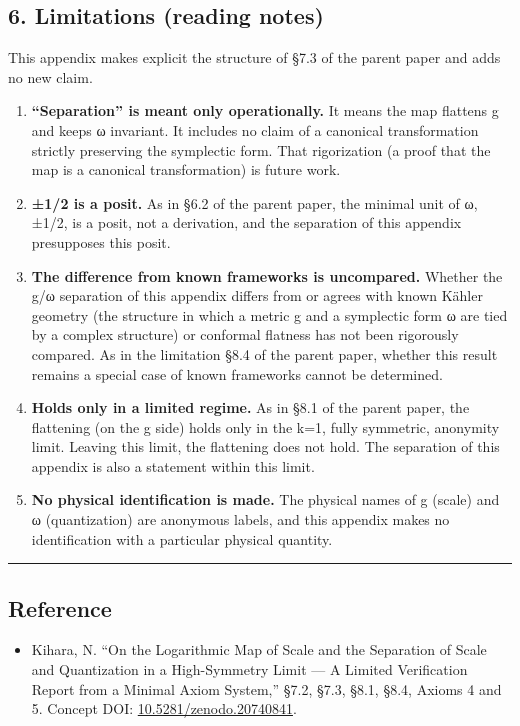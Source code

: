 \documentclass[11pt]{ltjsarticle}
\providecommand{\tightlist}{\setlength{\itemsep}{0pt}\setlength{\parskip}{0pt}}
\begin{document}
\subsection{6. Limitations (reading
notes)}\label{limitations-reading-notes}

This appendix makes explicit the structure of §7.3 of the parent paper
and adds no new claim.

\begin{enumerate}
\def\labelenumi{\arabic{enumi}.}
\item
  \textbf{``Separation'' is meant only operationally.} It means the map
  flattens g and keeps ω invariant. It includes no claim of a canonical
  transformation strictly preserving the symplectic form. That
  rigorization (a proof that the map is a canonical transformation) is
  future work.
\item
  \textbf{±1/2 is a posit.} As in §6.2 of the parent paper, the minimal
  unit of ω, ±1/2, is a posit, not a derivation, and the separation of
  this appendix presupposes this posit.
\item
  \textbf{The difference from known frameworks is uncompared.} Whether
  the g/ω separation of this appendix differs from or agrees with known
  Kähler geometry (the structure in which a metric g and a symplectic
  form ω are tied by a complex structure) or conformal flatness has not
  been rigorously compared. As in the limitation §8.4 of the parent
  paper, whether this result remains a special case of known frameworks
  cannot be determined.
\item
  \textbf{Holds only in a limited regime.} As in §8.1 of the parent
  paper, the flattening (on the g side) holds only in the k=1, fully
  symmetric, anonymity limit. Leaving this limit, the flattening does
  not hold. The separation of this appendix is also a statement within
  this limit.
\item
  \textbf{No physical identification is made.} The physical names of g
  (scale) and ω (quantization) are anonymous labels, and this appendix
  makes no identification with a particular physical quantity.
\end{enumerate}

\begin{center}\rule{0.5\linewidth}{0.5pt}\end{center}

\subsection{Reference}\label{reference}

\begin{itemize}
\tightlist
\item
  Kihara, N. ``On the Logarithmic Map of Scale and the Separation of
  Scale and Quantization in a High-Symmetry Limit --- A Limited
  Verification Report from a Minimal Axiom System,'' §7.2, §7.3, §8.1,
  §8.4, Axioms 4 and 5. Concept DOI:
  \href{https://doi.org/10.5281/zenodo.20740841}{10.5281/zenodo.20740841}.
\end{itemize}
\end{document}
